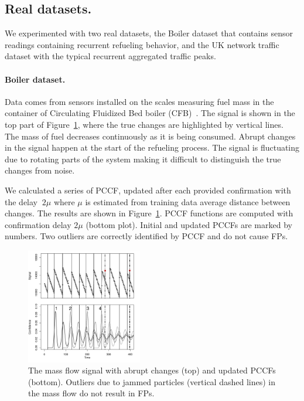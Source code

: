 \subsection{Real datasets.} We experimented with two real datasets, the Boiler dataset that contains sensor readings containing recurrent refueling behavior, and the UK network traffic dataset with the typical recurrent aggregated traffic peaks.
\paragraph{Boiler dataset.}
Data comes from sensors installed on the scales measuring fuel mass in the container of Circulating Fluidized Bed boiler (CFB)~\cite{PechenizkiySIGKDDExpl09}.
The signal is shown in the top part of Figure~\ref{fig:cfbsig}, where the true changes are highlighted by vertical lines.
The mass of fuel decreases continuously as it is being consumed.
Abrupt changes in the signal happen at the start of the refueling process.
The signal is fluctuating due to rotating parts of the system making it difficult to distinguish the true changes from noise.

We calculated a series of PCCF,  updated after each provided confirmation with the delay $~ 2 \mu$ where $\mu$ is estimated from training data average distance between changes.
The results are shown in Figure~\ref{fig:cfbsig}.
PCCF functions are computed with confirmation delay $2\mu$ (bottom plot). Initial and updated PCCFs are marked by numbers.
Two outliers are correctly identified by PCCF and do not cause FPs.
\begin{figure}[htb!]
\centering
\includegraphics[width = 0.45\textwidth, height = 0.35\textheight, ]{articles/pics/sdm_paper/cfbproof2.pdf}
\caption{
The mass flow signal with abrupt changes (top) and updated PCCFs (bottom).
Outliers due to jammed particles (vertical dashed lines) in the mass flow do not result in FPs.
}
\label{fig:cfbsig}
\end{figure}

